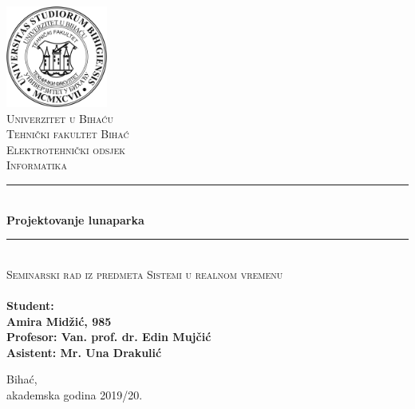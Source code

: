 \documentclass[12pt,oneside, a4paper]{book}
\newcommand{\HRule}{\rule{\linewidth}{0.5mm}}
\begin{document}

\frontmatter

\begin{titlepage}
\begin{center}

\includegraphics[width=0.25\textwidth]{logotransparent.png}~\\[0.1cm]
\textsc{\Large Univerzitet u Bihaću}\\[0.2cm]  
\textsc{\Large Tehnički fakultet Bihać}\\[0.2cm] 
\textsc{\Large  Elektrotehnički odsjek}\\[0.2cm] 
\textsc{\Large Informatika}\\[3cm]\HRule \\[0.5cm] 
{\huge \bfseries Projektovanje lunaparka} \\[0.4cm] 
\HRule \\[0.5cm]

\textsc{\Large Seminarski rad iz predmeta Sistemi u realnom vremenu}\\[0.4cm]
\textsc{\Large}\\[1.5cm]

\textbf{ 
\Large Student:\\  
\Large Amira Midžić, 985\\[1cm]  
\Large Profesor: Van. prof. dr. Edin Mujčić\\
\Large Asistent: Mr. Una Drakulić} 
\vfill

{\large Bihać, \\akademska godina 2019/20.}

\end{center} 
\end{titlepage}

\end{document}
